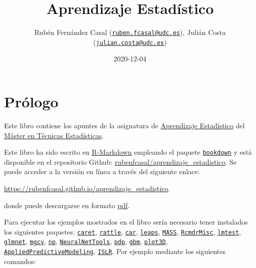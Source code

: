 \documentclass[
]{book}
\title{Aprendizaje Estadístico}
\author{Rubén Fernández Casal (\href{mailto:ruben.fcasal@udc.es}{\nolinkurl{ruben.fcasal@udc.es}}), Julián Costa (\href{mailto:julian.costa@udc.es}{\nolinkurl{julian.costa@udc.es}})}
\date{2020-12-04}
\theoremstyle{break}
\theoremstyle{definition}
\theoremstyle{definition}
\theoremstyle{definition}
\theoremstyle{remark}
\begin{document}
\maketitle

{
\setcounter{tocdepth}{1}
\tableofcontents
}
\hypertarget{pruxf3logo}{%
\chapter*{Prólogo}\label{pruxf3logo}}

Este libro contiene los apuntes de la asignatura de \href{http://eamo.usc.es/pub/mte/index.php?option=com_content\&view=article\&id=74}{Aprendizaje Estadístico} del \href{http://eio.usc.es/pub/mte}{Máster en Técnicas Estadísticas}.

Este libro ha sido escrito en \href{http://rmarkdown.rstudio.com}{R-Markdown} empleando el paquete \href{https://bookdown.org/yihui/bookdown/}{\texttt{bookdown}} y está disponible en el repositorio Github: \href{https://github.com/rubenfcasal/aprendizaje_estadistico}{rubenfcasal/aprendizaje\_estadistico}.
Se puede acceder a la versión en línea a través del siguiente enlace:

\url{https://rubenfcasal.github.io/aprendizaje_estadistico}.

donde puede descargarse en formato \href{https://rubenfcasal.github.io/aprendizaje_estadistico/aprendizaje_estadistico.pdf}{pdf}.

Para ejecutar los ejemplos mostrados en el libro sería necesario tener instalados los siguientes paquetes:
\href{https://CRAN.R-project.org/package=caret}{\texttt{caret}}, \href{https://CRAN.R-project.org/package=rattle}{\texttt{rattle}}, \href{https://CRAN.R-project.org/package=car}{\texttt{car}}, \href{https://CRAN.R-project.org/package=leaps}{\texttt{leaps}}, \href{https://CRAN.R-project.org/package=MASS}{\texttt{MASS}}, \href{https://CRAN.R-project.org/package=RcmdrMisc}{\texttt{RcmdrMisc}}, \href{https://CRAN.R-project.org/package=lmtest}{\texttt{lmtest}}, \href{https://CRAN.R-project.org/package=glmnet}{\texttt{glmnet}}, \href{https://CRAN.R-project.org/package=mgcv}{\texttt{mgcv}}, \href{https://CRAN.R-project.org/package=np}{\texttt{np}}, \href{https://CRAN.R-project.org/package=NeuralNetTools}{\texttt{NeuralNetTools}}, \href{https://CRAN.R-project.org/package=pdp}{\texttt{pdp}}, \href{https://CRAN.R-project.org/package=gbm}{\texttt{gbm}}, \href{https://CRAN.R-project.org/package=plot3D}{\texttt{plot3D}}, \href{https://CRAN.R-project.org/package=AppliedPredictiveModeling}{\texttt{AppliedPredictiveModeling}}, \href{https://CRAN.R-project.org/package=ISLR}{\texttt{ISLR}}.
Por ejemplo mediante los siguientes comandos:
\end{document}
